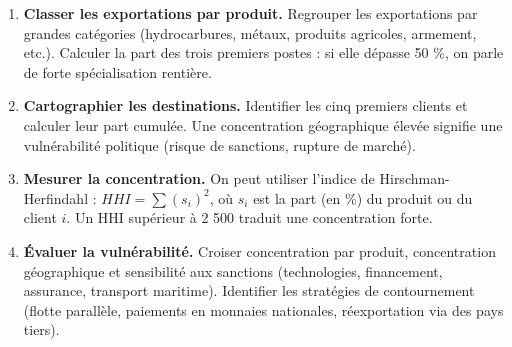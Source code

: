 \documentclass[11pt]{article}
\begin{document}
\begin{methode}
\begin{enumerate}
    \item \textbf{Classer les exportations par produit.} Regrouper les exportations par grandes catégories (hydrocarbures, métaux, produits agricoles, armement, etc.). Calculer la part des trois premiers postes : si elle dépasse 50 \%, on parle de forte spécialisation rentière.
    \item \textbf{Cartographier les destinations.} Identifier les cinq premiers clients et calculer leur part cumulée. Une concentration géographique élevée signifie une vulnérabilité politique (risque de sanctions, rupture de marché).
    \item \textbf{Mesurer la concentration.} On peut utiliser l'indice de Hirschman-Herfindahl : $HHI = \sum (s_i)^2$, où $s_i$ est la part (en \%) du produit ou du client $i$. Un HHI supérieur à 2 500 traduit une concentration forte.
    \item \textbf{Évaluer la vulnérabilité.} Croiser concentration par produit, concentration géographique et sensibilité aux sanctions (technologies, financement, assurance, transport maritime). Identifier les stratégies de contournement (flotte parallèle, paiements en monnaies nationales, réexportation via des pays tiers).
\end{enumerate}
\end{methode}
\end{document}

